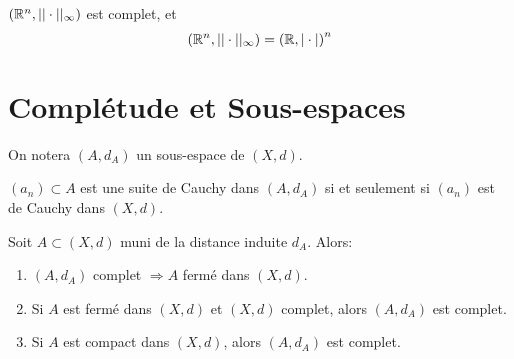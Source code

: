 \documentclass[french,a4paper,10pt]{article}
\begin{document}
    \begin{corollaire}
        $(\mathbb{R}^n, ||\cdot||_\infty)$ est complet, et
        \[
            \left(\mathbb{R}^n,||\cdot||_\infty\right) = {\left(\mathbb{R},|\cdot|\right)}^n
        \]
    \end{corollaire}

    \section{Complétude et Sous-espaces}

    \begin{notation}
        On notera $(A,d_A)$ un sous-espace de $(X,d)$.
    \end{notation}

    \begin{remark}
        $(a_n)\subset A$ est une suite de Cauchy dans $(A,d_A)$ si et seulement si $(a_n)$ est de Cauchy dans $(X,d)$.
    \end{remark}

    \begin{proposition}
        Soit $A\subset (X,d)$ muni de la distance induite $d_A$. Alors:
        \begin{enumerate}
            \item $(A,d_A)$ complet $\Rightarrow A$ fermé dans $(X,d)$.
            \item Si $A$ est fermé dans $(X,d)$ et $(X,d)$ complet, alors $(A,d_A)$ est complet.
            \item Si $A$ est compact dans $(X,d)$, alors $(A,d_A)$ est complet.
        \end{enumerate}
    \end{proposition}
\end{document}
